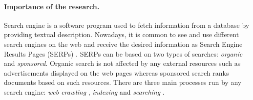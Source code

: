 % 


\paragraph{Importance of the research.}
Search engine is a software program used to fetch information from a database by providing textual 
description. Nowadays, it is common to see and use different search engines on the web and receive 
the desired information as Search Engine Results Pages (SERPs) \cite{enwiki:1094572512}. SERPs 
can be based on two types of searches: \textit{organic} and \textit{sponsored}. Organic search 
is not affected by any external resources such as advertisements displayed on the web pages whereas 
sponsored search ranks documents based on such resources.
There are three main processes run by any search engine: \textit{web crawling} \cite{enwiki:1082281684}, 
\textit{indexing} \cite{enwiki:1088909238} and \textit{searching} \cite{enwiki:1088145469}.

